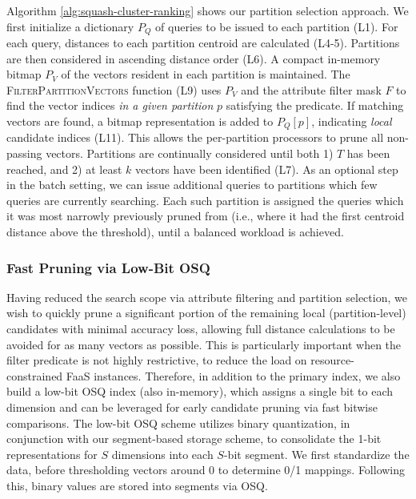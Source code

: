 Algorithm \ref{alg:squash-cluster-ranking} shows our partition selection approach. 
We first initialize a dictionary $P_Q$ of queries to be issued to each partition (L1).
For each query, distances to each partition centroid are calculated (L4-5). 
Partitions are then considered in ascending distance order (L6). A compact in-memory bitmap $P_V$ of the vectors resident in each partition is maintained.
The \textsc{FilterPartitionVectors} function (L9) uses $P_V$ and the attribute filter mask $F$ to find the vector indices \textit{in a given partition} $p$ satisfying the predicate. 
If matching vectors are found, a bitmap representation is added to $P_Q[p]$, indicating \textit{local} candidate indices (L11).
This allows the per-partition processors to prune all non-passing vectors. 
Partitions are continually considered until both 1) $T$ has been reached, and 2) at least $k$ vectors have been identified (L7).
As an optional step in the batch setting, we can issue additional queries to partitions which few queries are currently searching. 
Each such partition is assigned the queries which it was most narrowly previously pruned from (i.e., where it had the first centroid distance above the threshold), until a balanced workload is achieved.

\subsubsection{Fast Pruning via Low-Bit OSQ}
Having reduced the search scope via attribute filtering and partition selection, we wish to quickly prune a significant portion of the remaining local (partition-level) candidates with minimal accuracy loss, allowing full distance calculations to be avoided for as many vectors as possible. This is particularly important when the filter predicate is not highly restrictive, to reduce the load on resource-constrained FaaS instances.
Therefore, in addition to the primary index, we also build a low-bit OSQ index (also in-memory), which assigns a single bit to each dimension and can be leveraged for early candidate pruning via fast bitwise comparisons.
The low-bit OSQ scheme utilizes binary quantization, in conjunction with our segment-based storage scheme, to consolidate the 1-bit representations for $S$ dimensions into each $S$-bit segment.
We first standardize the data, before thresholding vectors around 0 to determine 0/1 mappings. Following this, binary values are stored into segments via OSQ.

